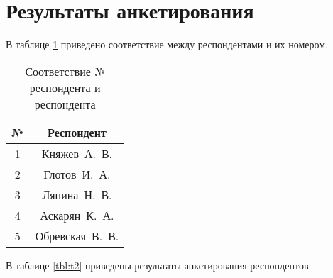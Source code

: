 \section{Результаты анкетирования}

В таблице \ref{tbl:t1} приведено соответствие между респондентами и их номером.

\begin{table}[H]
	\begin{center}
	\caption{Соответствие № респондента и респондента}
	\label{tbl:t1}
	\begin{tabular}{|c|c|}
		\hline
		№  & Респондент      \\ \hline
		1              & Княжев~А.~В.    \\ \hline
		2              & Глотов~И.~А.   \\ \hline
		3              & Ляпина~Н.~В.    \\ \hline
		4              & Аскарян~К.~А.   \\ \hline
		5              & Обревская~В.~В. \\ \hline
	\end{tabular}
	\end{center}
\end{table}


В таблице \ref{tbl:t2} приведены результаты анкетирования респондентов.

